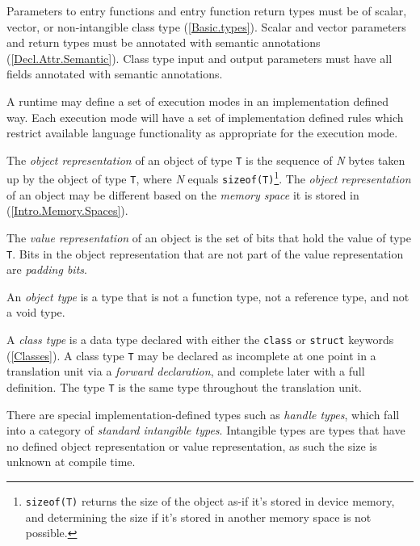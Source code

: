\p Parameters to entry functions and entry function return types must be of
scalar, vector, or non-intangible class type (\ref{Basic.types}). Scalar and
vector parameters and return types must be annotated with semantic annotations
(\ref{Decl.Attr.Semantic}). Class type input and output parameters must have all
fields annotated with semantic annotations.


\p A runtime may define a set of execution modes in an implementation defined
way. Each execution mode will have a set of implementation defined rules which
restrict available language functionality as appropriate for the execution mode.


\p The \textit{object representation} of an object of type \texttt{T} is the
sequence of \textit{N} bytes taken up by the object of type \texttt{T}, where
\textit{N} equals \texttt{sizeof(T)}\footnote{\texttt{sizeof(T)} returns the
size of the object as-if it's stored in device memory, and determining the size
if it's stored in another memory space is not possible.}. The \textit{object
representation} of an object may be different based on the \textit{memory space}
it is stored in (\ref{Intro.Memory.Spaces}).

\p The \textit{value representation} of an object is the set of bits that hold
the value of type \texttt{T}. Bits in the object representation that are not
part of the value representation are \textit{padding bits}.

\p An \textit{object type} is a type that is not a function type, not a
reference type, and not a void type.

\p A \textit{class type} is a data type declared with either the \texttt{class}
or \texttt{struct} keywords (\ref{Classes}). A class type \texttt{T} may be
declared as incomplete at one point in a translation unit via a \textit{forward
declaration}, and complete later with a full definition. The type \texttt{T} is
the same type throughout the translation unit.

\p There are special implementation-defined types such as \textit{handle types},
which fall into a category of \textit{standard intangible types}. Intangible
types are types that have no defined object representation or value
representation, as such the size is unknown at compile time.

